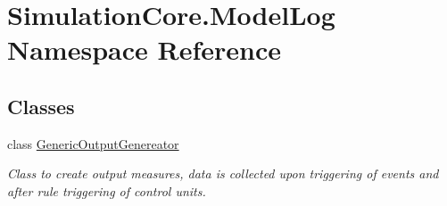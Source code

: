 \hypertarget{namespace_simulation_core_1_1_model_log}{}\section{Simulation\+Core.\+Model\+Log Namespace Reference}
\label{namespace_simulation_core_1_1_model_log}
\subsection*{Classes}
\begin{DoxyCompactItemize}
\item 
class \hyperlink{class_simulation_core_1_1_model_log_1_1_generic_output_genereator}{Generic\+Output\+Genereator}
\begin{DoxyCompactList}\small\item\em Class to create output measures, data is collected upon triggering of events and after rule triggering of control units. \end{DoxyCompactList}\end{DoxyCompactItemize}
